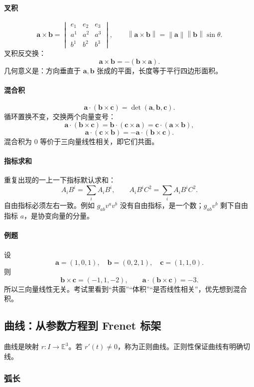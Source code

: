 \documentclass[UTF8,12pt,a4paper]{ctexart}
\newcommand{\E}{\mathbb E}
\newcommand{\vct}[1]{\boldsymbol{#1}}
\newcommand{\norm}[1]{\left\lVert #1\right\rVert}
\begin{document}
\paragraph{叉积}
\[
\vct a\times\vct b=
\begin{vmatrix}
e_1&e_2&e_3\\
a^1&a^2&a^3\\
b^1&b^2&b^3
\end{vmatrix},
\qquad
\norm{\vct a\times\vct b}=\norm{\vct a}\norm{\vct b}\sin\theta.
\]
叉积反交换：
\[
\vct a\times\vct b=-(\vct b\times\vct a).
\]
几何意义是：方向垂直于 $\vct a,\vct b$ 张成的平面，长度等于平行四边形面积。

\paragraph{混合积}
\[
\vct a\cdot(\vct b\times\vct c)=
\det(\vct a,\vct b,\vct c).
\]
循环置换不变，交换两个向量变号：
\[
\vct a\cdot(\vct b\times\vct c)
=\vct b\cdot(\vct c\times\vct a)
=\vct c\cdot(\vct a\times\vct b),
\]
\[
\vct a\cdot(\vct c\times\vct b)
=-\vct a\cdot(\vct b\times\vct c).
\]
混合积为 $0$ 等价于三向量线性相关，即它们共面。

\paragraph{指标求和}
重复出现的一上一下指标默认求和：
\[
A_iB^i=\sum_iA_iB^i,\qquad
A_iB^iC^2=\sum_iA_iB^iC^2.
\]
自由指标必须左右一致。例如 $g_{ab}v^av^b$ 没有自由指标，是一个数；$g_{ab}v^b$ 剩下自由指标 $a$，是协变向量的分量。

\paragraph{例题}
设
\[
\vct a=(1,0,1),\quad \vct b=(0,2,1),\quad \vct c=(1,1,0).
\]
则
\[
\vct b\times\vct c=(-1,1,-2),
\qquad
\vct a\cdot(\vct b\times\vct c)=-3.
\]
所以三向量线性无关。考试里看到“共面”“体积”“是否线性相关”，优先想到混合积。

\subsection{曲线：从参数方程到 Frenet 标架}

曲线是映射 $r:I\to\E^3$。若 $r'(t)\ne0$，称为正则曲线。正则性保证曲线有明确切线。

\subsubsection*{弧长}
\end{document}
